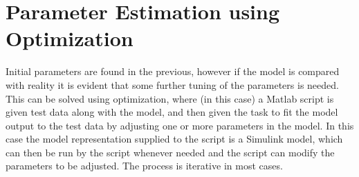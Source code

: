 \section{Parameter Estimation using Optimization}
Initial parameters are found in the previous, however if the model is compared with reality it is evident that some further tuning of the parameters is needed. This can be solved using optimization, where (in this case) a Matlab script is given test data along with the model, and then given the task to fit the model output to the test data by adjusting one or more parameters in the model. In this case the model representation supplied to the script is a Simulink model, which can then be run by the script whenever needed and the script can modify the parameters to be adjusted. The process is iterative in most cases.



